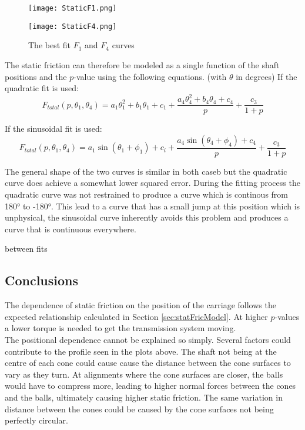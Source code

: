 \documentclass[12pt]{article}
\begin{document}
\begin{figure}[!h]
    \centering
    \begin{minipage}{0.49\textwidth}       
         \texttt{[image: StaticF1.png]}
    \end{minipage}
    \begin{minipage}{0.49\textwidth}       
         \texttt{[image: StaticF4.png]}
    \end{minipage}

\label{fig:staticFitCurves}
\caption{The best fit $F_1$ and $F_4$ curves}

\end{figure}

The static friction can therefore be modeled as a single function of the shaft positions and the $p$-value using the following equations. (with $\theta$ in degrees)
If the quadratic fit is used:\\

$$F_{total} (p, \theta_1, \theta_4) = a_1 \theta_1^2 + b_1 \theta_1 + c_1 + \frac{ a_4 \theta_4^2 + b_4 \theta_4 + c_4 }{p} + \frac{c_3}{1+p}$$

If the sinusoidal fit is used:\\
$$F_{total} (p, \theta_1, \theta_4)= a_1 \sin\left( \theta_1 + \phi_1  \right)  + c_i + \frac{a_4 \sin\left( \theta_4 + \phi_4  \right)  + c_4}{p} + \frac{c_3}{1+p}$$

The general shape of the two curves is similar in both caseb but the quadratic curve does achieve a somewhat lower squared error. During the fitting process the quadratic curve was not restrained to produce a curve which is continous from 180° to -180°. This lead to a curve that has a small jump at this position which is unphysical, the sinusoidal curve inherently avoids this problem and produces a curve that is continuous everywhere.

\comparison between fits

 
\subsection{Conclusions}
The dependence of static friction on the position of the carriage follows the expected relationship calculated in Section \ref{sec:statFricModel}. At higher $p$-values a lower torque is needed to get the transmission system moving. \\

The positional dependence cannot be explained so simply. Several factors could contribute to the profile seen in the plots above. The shaft not being at the centre of each cone could cause cause the distance between the cone surfaces to vary as they turn. At alignments where the cone surfaces are closer, the balls would have to compress more, leading to higher normal forces between the cones and the balls, ultimately causing higher static friction. The same variation in distance between the cones could be caused by the cone surfaces not being perfectly circular.\\
\end{document}
